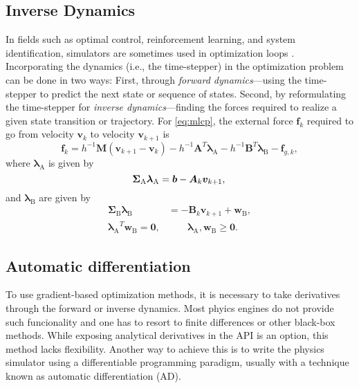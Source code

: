 \documentclass[preprint,12pt]{elsarticle}
\let\vec\bm
\let\mat\mathbf
\numberwithin{equation}{section}
\def\tA{\text{A}}
\def\tB{\text{B}}
\newcommand{\complementarityalign}[2]{{#1}^T{#2}=\vec{0}, &\qquad #1, #2 \geq \vec{0}}
\begin{document}
\subsection{Inverse Dynamics}
\label{sec:multibody_in_optimization}
In fields such as optimal control, reinforcement learning, and system identification, simulators are sometimes used in optimization loops  \cite{newburyReviewDifferentiableSimulators2024}.
Incorporating the dynamics (i.e., the time-stepper) in the optimization problem can be done in two ways:
First, through \emph{forward dynamics}---using the time-stepper to predict the next state or sequence of states. Second, by reformulating the time-stepper for \emph{inverse dynamics}---finding the forces required to realize a given state transition or trajectory.
For \eqref{eq:mlcp}, the external force $\vec{f}_k$ required to go from velocity $\vec{v}_k$ to velocity $\vec{v}_{k+1}$ is
\begin{equation}
    \vec{f}_k = h^{-1} \mat{M} (\vec{v}_{k+1} - \vec{v}_k) - h^{-1} \mat{A}^T \vec{\lambda}_\tA - h^{-1} \mat{B}^T \vec{\lambda}_\tB - \vec{f}_{g,k},
\end{equation}
where $\vec{\lambda}_\tA$ is given by
\begin{equation}
    \mat{\Sigma}_\tA \vec{\lambda}_\tA = \vec{b} - \vec{A}_k \vec{v}_{k+1}, \\
\end{equation}
and $\vec{\lambda}_\tB$ are given by
\begin{equation}
    \begin{aligned}
        \mat{\Sigma}_\tB \vec{\lambda}_\tB &= - \mat{B}_k \vec{v}_{k+1} + \vec{w}_\tB, \\
        \complementarityalign{\vec{\lambda}_\tA}{\vec{w}_\tB}.
    \end{aligned}
\end{equation}

\subsection{Automatic differentiation}
To use gradient-based optimization methods, it is necessary to take derivatives through the forward or inverse dynamics.
Most phyics engines do not provide such funcionality and one has to resort to finite differences or other black-box methods.
While exposing analytical derivatives in the API is an option, this method lacks flexibility.
Another way to achieve this is to write the physics simulator using a differentiable programming paradigm, usually with a technique known as automatic differentiation (AD).
\end{document}
